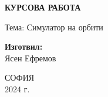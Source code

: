 \graphicspath{ {./images/} }

\begin{titlepage}
	\begin{adjustbox}{tabular=m{3cm} m{14cm}, center}
	\end{adjustbox}


    \begin{center}
        \vspace{4cm}
        \textbf{\Huge КУРСОВА РАБОТА}


    
        \vspace{3cm}
        {\LARGE Тема: Симулатор на орбити}
    
        \vspace{5cm}
        \textbf{Изготвил:} \\
        Ясен Ефремов
    
        \vfill
        СОФИЯ \\
        2024 г.
    \end{center}
\end{titlepage}
